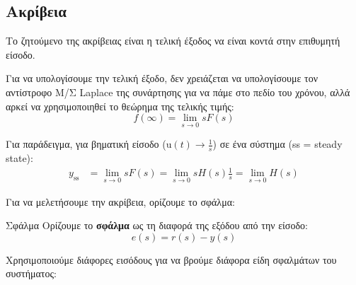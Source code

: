 \documentclass[11pt,a4paper,notitlepage,fleqn,final]{article}
\begin{document}
\subsection{Ακρίβεια}
Το ζητούμενο της ακρίβειας είναι η τελική έξοδος να είναι κοντά στην επιθυμητή είσοδο.

Για να υπολογίσουμε την τελική έξοδο, δεν χρειάζεται να υπολογίσουμε τον αντίστροφο Μ/Σ
Laplace της συνάρτησης για να πάμε στο πεδίο του χρόνου, αλλά αρκεί να χρησιμοποιηθεί το θεώρημα της τελικής τιμής:
\[
f(\infty) = \lim_{s\to 0} sF(s)
 \]

Για παράδειγμα, για βηματική είσοδο (\( \mathrm u(t) \rightarrow \frac{1}{s}\))
σε ένα σύστημα (ss = steady state):
\begin{align*}
	y_{\mathrm{ss}} &= \lim_{s\to 0} sF(s) = \lim_{s\to 0} sH(s)\frac{1}{s} =
	\lim_{s\to 0} H(s)
\end{align*}

\begin{comment}
\begin{tikzpicture}
\def\h{0.6}
\def\l{1.2}
\def\ll{0.75}
\draw[->] (0,0) node[left] {$r(s)$} -- (1-0.2,0);
\begin{scope}[xshift=1cm]
\draw (0,0) circle (2mm);
\draw (0.2,0) -- ++(0.75,0);
\draw (0.2+0.75, -\h/2) rectangle ++(\l, \h) node[midway] {$G_1(s)$};
\draw (\l+0.2+0.75,0) -- (3,0);
\draw  (3, -\h/2) rectangle ++(\l, \h) node[midway] {$G_2(s)$};
\draw (3+\l,0) -- (5-0.2,0);
\draw[->] (5,1) -- ++(0,-1+0.2) node[midway,right] {$d(s)$};
\draw (5,0) circle (2mm);
\draw[->] (5+0.2,0) -- ++(1,0) node[right] {$y$};
\end{scope}

\draw[->] (4.5+2.2,0) -- ++(0,-1.5) -- (4,-1.5);
\draw (4,-1.5-\h/2) rectangle ++(-\l,\h) node[midway] {$H(s)$};
\draw[->] (4-\l,-1.5) -- (1,-1.5) -- (1,-0.2);
\end{tikzpicture}
\end{comment}

Για να μελετήσουμε την ακρίβεια, ορίζουμε το σφάλμα:
\begin{defn}{Σφάλμα}{}
	Ορίζουμε το \textbf{σφάλμα} ως τη διαφορά της εξόδου από την είσοδο:
	\[
	e(s) = r(s) - y(s)
	\]
\end{defn}

Χρησιμοποιούμε διάφορες εισόδους για να βρούμε διάφορα είδη σφαλμάτων του συστήματος:
\end{document}
